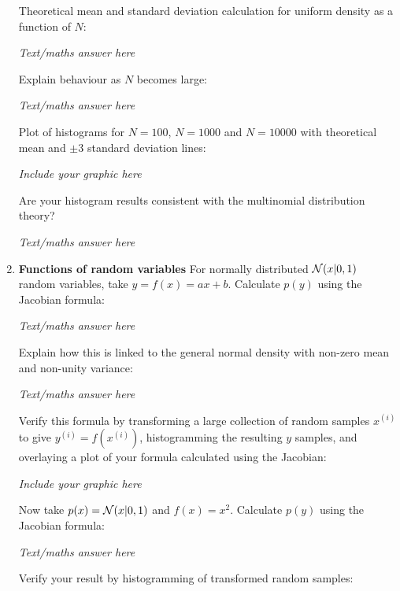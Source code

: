 \documentclass[12pt]{article}
\begin{document}
\begin{enumerate}
Theoretical  mean and standard deviation calculation for uniform density as a function of $N$:


{\em Text/maths answer  here}
\vspace{3in}


Explain behaviour as $N$ becomes large:

{\em Text/maths answer  here}
\vspace{3in}



Plot of histograms for $N=100$,  $N=1000$ and $N=10000$ with theoretical mean  and $\pm 3$ standard deviation lines:


{\em Include your graphic here}
\vspace{3in}




 Are your histogram results consistent with the multinomial distribution theory? 


{\em Text/maths answer  here}
\vspace{3in}


\item {\bf Functions of random variables}
For normally distributed ${\cal N}(x|0,1)$ random variables, take $y=f(x)=ax+b$. Calculate $p(y)$ using the Jacobian formula:


{\em Text/maths answer  here}
\vspace{3in}


Explain how this is linked to the general normal density with non-zero mean and non-unity variance:


{\em Text/maths answer  here}
\vspace{3in}



 Verify this formula by transforming a large collection of random samples $x^{(i)}$ to give $y^{(i)}=f(x^{(i)})$, histogramming the resulting $y$ samples, and overlaying a plot of your formula calculated using the Jacobian:


{\em Include your graphic here}
\vspace{3in}




Now take $p(x)={\cal N}(x|0,1)$ and $f(x)=x^2$. Calculate $p(y)$ using the Jacobian formula:

{\em Text/maths answer  here}
\vspace{3in}




 Verify your result by histogramming of transformed random samples:



\end{enumerate}
\end{document}
